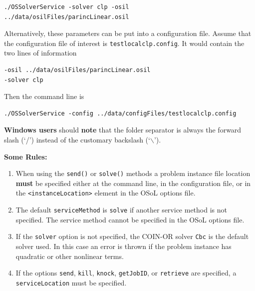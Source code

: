 \documentclass[11pt]{article}
\renewcommand{\_}{{\char"5F}}
\renewcommand{\{}{{\char"7B}}
\renewcommand{\}}{{\char"7D}}
\renewcommand{\^}{{\char"0D}}
\renewcommand{\'}{{\char"0D}}
\begin{document}
\begin{enumerate}[Step 1:]
\begin{verbatim}
./OSSolverService -solver clp -osil ../data/osilFiles/parincLinear.osil
\end{verbatim}

Alternatively, these parameters can be put into a configuration file.
Assume that the configuration file of interest is {\tt testlocalclp.config}.
It would contain the two lines of information
\begin{verbatim}
-osil ../data/osilFiles/parincLinear.osil
-solver clp
\end{verbatim}
Then the command line is
\begin{verbatim}
./OSSolverService -config ../data/configFiles/testlocalclp.config
\end{verbatim}

{\bf Windows users} should {\bf note} that the folder separator is always 
the forward slash (`/') instead of the customary backslash (`$\backslash$').

\medskip

{\bf Some Rules:}

\begin{enumerate}
\item{}  When using the {\tt send()} or  {\tt solve()} methods
a problem instance file location {\bf must} be specified either at  the command line, in the configuration file,
or in the {\tt <instanceLocation>} element in the OSoL options file.

\item{}  The default {\tt serviceMethod} is {\tt solve} if another service method is not specified.
The service method cannot be specified in the OSoL options file.

\item{}  If the {\tt solver} option is not specified, the COIN-OR solver {\tt Cbc} is the default
solver used. In this case an error is thrown if the problem instance has quadratic or other nonlinear terms.

\item{}  If the options {\tt send}, {\tt kill},
{\tt knock},  {\tt getJobID},
or {\tt retrieve} are specified,
a  {\tt serviceLocation} must be specified.


\end{enumerate}
\end{enumerate}
\end{document}
